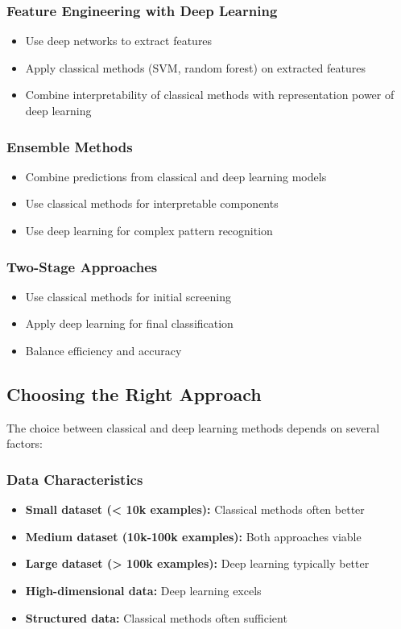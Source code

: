 \subsubsection{Feature Engineering with Deep Learning}
\begin{itemize}
    \item Use deep networks to extract features
    \item Apply classical methods (SVM, random forest) on extracted features
    \item Combine interpretability of classical methods with representation power of deep learning
\end{itemize}

\subsubsection{Ensemble Methods}
\begin{itemize}
    \item Combine predictions from classical and deep learning models
    \item Use classical methods for interpretable components
    \item Use deep learning for complex pattern recognition
\end{itemize}

\subsubsection{Two-Stage Approaches}
\begin{itemize}
    \item Use classical methods for initial screening
    \item Apply deep learning for final classification
    \item Balance efficiency and accuracy
\end{itemize}

\subsection{Choosing the Right Approach}

The choice between classical and deep learning methods depends on several factors:

\subsubsection{Data Characteristics}
\begin{itemize}
    \item \textbf{Small dataset (< 10k examples):} Classical methods often better
    \item \textbf{Medium dataset (10k-100k examples):} Both approaches viable
    \item \textbf{Large dataset (> 100k examples):} Deep learning typically better
    \item \textbf{High-dimensional data:} Deep learning excels
    \item \textbf{Structured data:} Classical methods often sufficient
\end{itemize}

